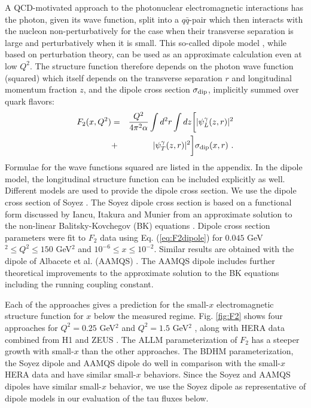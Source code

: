 \documentclass[aps,10pt,twocolumn,tightenlines]{revtex4-1}
\begin{document}
A QCD-motivated
approach to the photonuclear electromagnetic interactions has the photon, given its wave function,
 split into a  $q\bar{q}$-pair which then interacts with the nucleon non-perturbatively for the
case when their transverse separation is large and perturbatively when
it is small.   
This so-called dipole model \cite{Nikolaev:1990ja,Mueller:1993rr}, while based on perturbation theory, can be used as
an approximate calculation even at low $Q^2$.
The structure function therefore depends on the photon wave function (squared) which itself depends on the transverse separation $r$ and longitudinal
momentum fraction $z$, and the dipole cross section $\sigma_{\rm dip}$, implicitly summed over quark flavors:
\begin{eqnarray}
\nonumber
F_2(x,Q^2) &=& \frac{Q^2}{4\pi^2 \alpha} \int d^2 r\int dz\biggl[ |\psi_L^\gamma(z,r)|^2 \\
&+&
|\psi_T^\gamma(z,r)|^2\biggr] \sigma_{\rm dip}(x,r)\ .
\label{eq:F2dipole}
\end{eqnarray}
Formulae for the wave functions squared are listed in the appendix. In the dipole model, the longitudinal structure function can be included explicitly as well. Different models are used to provide the dipole
cross section. We use the dipole cross section of
Soyez \cite{Soyez:2007kg}. The Soyez dipole cross section
is based on a functional form discussed by Iancu, Itakura and Munier \cite{Iancu:2003ge} from an approximate
solution to the non-linear Balitsky-Kovchegov (BK) equations \cite{Balitsky:1995ub,Kovchegov:1999yj}. Dipole cross section
parameters were fit to $F_2$ data using 
Eq. (\ref{eq:F2dipole}) for $0.045$ GeV$^2\leq Q^2\leq 150$ GeV$^2$ and $10^{-6}\leq x\leq 10^{-2}$.
Similar results are obtained with the dipole of Albacete et al. (AAMQS) \cite{Albacete:2015zra}. The
AAMQS dipole includes further theoretical improvements to the approximate solution to the BK equations including the running coupling constant.

Each of the approaches gives a prediction for the small-$x$ electromagnetic structure function for $x$ below the measured regime. Fig. \ref{fig:F2} shows four approaches for $Q^2=0.25$ GeV$^2$ and $Q^2=1.5$ GeV$^2$ , along with HERA data combined from H1 and ZEUS \cite{Aaron:2009aa}.   The ALLM parameterization of $F_2$ has a steeper growth with 
small-$x$ than the other approaches. The BDHM parameterization, the Soyez dipole and AAMQS dipole do well in comparison with the small-$x$ HERA data and have similar small-$x$ behaviors. 
Since the Soyez and AAMQS dipoles have similar small-$x$ behavior, we use the Soyez dipole as representative of dipole models in our evaluation of the tau fluxes below. 
\end{document}

